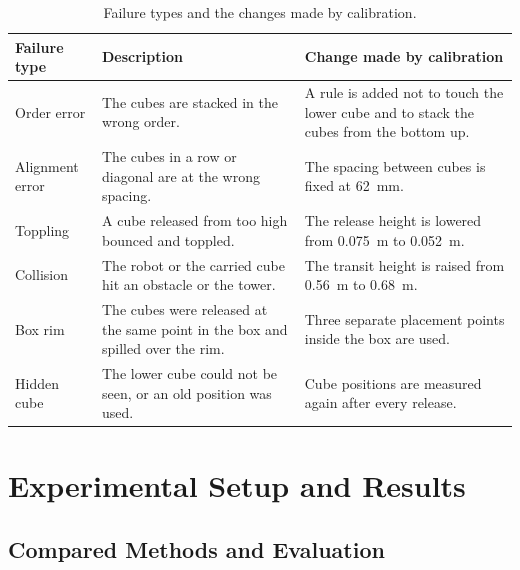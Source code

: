 \documentclass[preprint,12pt]{elsarticle}
\begin{document}
\begin{table}[htbp]
\centering
\caption{Failure types and the changes made by calibration.}
\label{tab:failures}
\begin{tabularx}{\textwidth}{@{}l Y Y@{}}
\toprule
Failure type & Description & Change made by calibration \\
\midrule
Order error & The cubes are stacked in the wrong order. & A rule is added not to touch the lower cube and to stack the cubes from the bottom up. \\
Alignment error & The cubes in a row or diagonal are at the wrong spacing. & The spacing between cubes is fixed at 62~mm. \\
Toppling & A cube released from too high bounced and toppled. & The release height is lowered from 0.075~m to 0.052~m. \\
Collision & The robot or the carried cube hit an obstacle or the tower. & The transit height is raised from 0.56~m to 0.68~m. \\
Box rim & The cubes were released at the same point in the box and spilled over the rim. & Three separate placement points inside the box are used. \\
Hidden cube & The lower cube could not be seen, or an old position was used. & Cube positions are measured again after every release. \\
\bottomrule
\end{tabularx}
\end{table}

\section{Experimental Setup and Results}

\subsection{Compared Methods and Evaluation}
\end{document}
